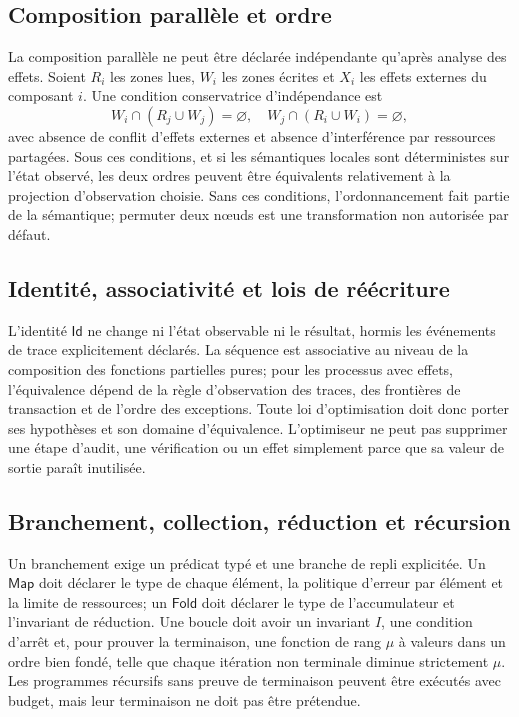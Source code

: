 \documentclass[11pt,a4paper]{article}
\theoremstyle{definition}
\theoremstyle{plain}
\theoremstyle{remark}
\begin{document}
\subsection{Composition parallèle et ordre}
La composition parallèle ne peut être déclarée indépendante qu'après analyse des effets. Soient $R_i$ les zones lues, $W_i$ les zones écrites et $X_i$ les effets externes du composant $i$. Une condition conservatrice d'indépendance est
\[
W_i\cap(R_j\cup W_j)=\varnothing,\quad W_j\cap(R_i\cup W_i)=\varnothing,
\]
avec absence de conflit d'effets externes et absence d'interférence par ressources partagées. Sous ces conditions, et si les sémantiques locales sont déterministes sur l'état observé, les deux ordres peuvent être équivalents relativement à la projection d'observation choisie. Sans ces conditions, l'ordonnancement fait partie de la sémantique; permuter deux nœuds est une transformation non autorisée par défaut.

\subsection{Identité, associativité et lois de réécriture}
L'identité $\mathsf{Id}$ ne change ni l'état observable ni le résultat, hormis les événements de trace explicitement déclarés. La séquence est associative au niveau de la composition des fonctions partielles pures; pour les processus avec effets, l'équivalence dépend de la règle d'observation des traces, des frontières de transaction et de l'ordre des exceptions. Toute loi d'optimisation doit donc porter ses hypothèses et son domaine d'équivalence. L'optimiseur ne peut pas supprimer une étape d'audit, une vérification ou un effet simplement parce que sa valeur de sortie paraît inutilisée.

\subsection{Branchement, collection, réduction et récursion}
Un branchement exige un prédicat typé et une branche de repli explicitée. Un $\mathsf{Map}$ doit déclarer le type de chaque élément, la politique d'erreur par élément et la limite de ressources; un $\mathsf{Fold}$ doit déclarer le type de l'accumulateur et l'invariant de réduction. Une boucle doit avoir un invariant $I$, une condition d'arrêt et, pour prouver la terminaison, une fonction de rang $\mu$ à valeurs dans un ordre bien fondé, telle que chaque itération non terminale diminue strictement $\mu$. Les programmes récursifs sans preuve de terminaison peuvent être exécutés avec budget, mais leur terminaison ne doit pas être prétendue.
\end{document}
